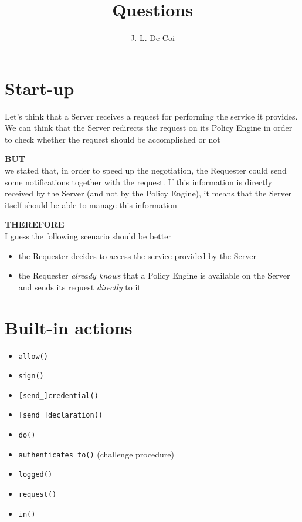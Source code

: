 \documentclass{article}
\begin{document}
\title{Questions}
\author{J. L. De Coi}
\maketitle

\section{Start-up}

Let's think that a Server receives a request for performing the service it provides. We can think that the Server redirects the request on its Policy Engine in order to check whether the request should be accomplished or not

\textbf{BUT}\\
we stated that, in order to speed up the negotiation, the Requester could send some notifications together with the request. If this information is directly received by the Server (and not by the Policy Engine), it means that the Server itself should be able to manage this information

\textbf{THEREFORE}\\
I guess the following scenario should be better

\begin{itemize}
	\item the Requester decides to access the service provided by the Server
	\item the Requester \emph{already knows} that a Policy Engine is available on the Server and sends its request \emph{directly} to it
\end{itemize}

\section{Built-in actions}

\begin{itemize}
	\item \texttt{allow()}
	\item \texttt{sign()}
	\item \texttt{[send\_]credential()}
	\item \texttt{[send\_]declaration()}
	\item \texttt{do()}
	\item \texttt{authenticates\_to()} (challenge procedure)
	\item \texttt{logged()}
	\item \texttt{request()}
	\item \texttt{in()}
\end{itemize}
\end{document}
